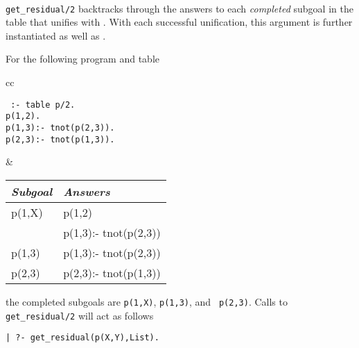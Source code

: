 \begin{description}
\begin{minipage}{6.1in}
\end{minipage} \\


%
%
{\tt get\_residual/2} backtracks through the answers to each
\emph{completed} subgoal in the table that unifies with
.  With each successful unification, this argument is
further instantiated as well as .

\begin{example} \label{ex:residual-program}
For the following program and table
     \begin{center}
     \begin{tabular}{cc}
     \begin{minipage}{2.1in}
     {\tt
          :- table p/2. \\
          p(1,2). \\
          p(1,3):- tnot(p(2,3)). \\
          p(2,3):- tnot(p(1,3)). 
     }
     \end{minipage}
     &
     \begin{tabular}{||l|l||}   \hline
     {\em Subgoal}                 & {\em Answers} \\ \hline \hline
     p(1,X)                     & p(1,2) \\ 
                                & p(1,3):- tnot(p(2,3)) \\ \hline
     p(1,3)                     & p(1,3):- tnot(p(2,3)) \\ \hline
     p(2,3)                     & p(2,3):- tnot(p(1,3)) \\ \hline
     \end{tabular}
     \end{tabular}
     \end{center}
the completed subgoals are {\tt p(1,X)}, {\tt p(1,3)}, and {\tt
p(2,3)}.  Calls to {\tt get\_residual/2} will act as follows
%
\begin{center}
\begin{small}
\begin{verbatim} 
| ?- get_residual(p(X,Y),List).


\end{verbatim}
\end{small}
\end{center}
\end{example}
\end{description}
